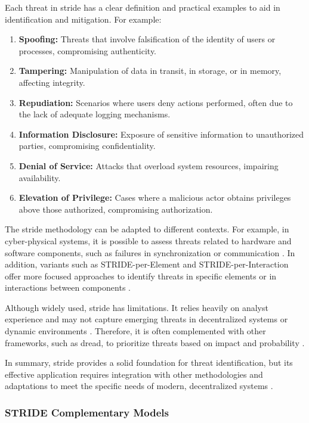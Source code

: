 Each threat in \gls{stride} has a clear definition and practical examples to aid
in identification and mitigation. For example:

\begin{enumerate}
    \item \textbf{Spoofing:} Threats that involve falsification of the
identity of users or processes, compromising authenticity.
    \item \textbf{Tampering:} Manipulation of data in transit, in
storage, or in memory, affecting integrity.
    \item \textbf{Repudiation:} Scenarios where users deny actions
performed, often due to the lack of adequate logging mechanisms.
    \item \textbf{Information Disclosure:} Exposure of
sensitive information to unauthorized parties, compromising
confidentiality.
    \item \textbf{Denial of Service:} Attacks that overload
system resources, impairing availability.
    \item \textbf{Elevation of Privilege:} Cases where a malicious
actor obtains privileges above those authorized, compromising authorization.
\end{enumerate}

The \gls{stride} methodology can be adapted to different contexts. For example,
in cyber-physical systems, it is possible to assess threats related to hardware
and software components, such as failures in synchronization or communication
\cite{STRIDEthreatmodelingforcyberphysical}. In addition, variants such as
STRIDE-per-Element and STRIDE-per-Interaction offer more focused approaches to
identify threats in specific elements or in interactions between components
\cite{ThreatModelingdesigningForSecurity}.

Although widely used, \gls{stride} has limitations. It relies heavily on analyst
experience and may not capture emerging threats in decentralized systems or
dynamic environments \cite{SecurityDevelopmentLifecycle}. Therefore, it is often
complemented with other frameworks, such as \gls{dread}, to prioritize threats
based on impact and probability \cite{DREADful}.

In summary, \gls{stride} provides a solid foundation for threat identification,
but its effective application requires integration with other methodologies and
adaptations to meet the specific needs of modern, decentralized systems
\cite{UncoverSecurityDesignFlawsSTRIDE}.

\subsubsection{STRIDE Complementary Models}
\label{subsubsec:stride_complementary_models}

